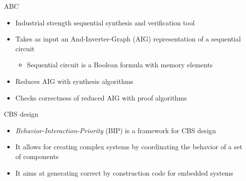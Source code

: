 \begin{frame}{ABC~\cite{brayton2010abc}}
 \begin{itemize}
  \item 
   Industrial strength sequential synthesis and verification tool
  \item 
   Takes as input an And-Inverter-Graph (AIG) representation of a sequential circuit
 \begin{itemize}
  \item Sequential circuit is a Boolean formula with memory elements
 \end{itemize}
  \item Reduces AIG with synthesis algorithms 
  \item Checks correctness of reduced AIG with proof algorithms
 \end{itemize}
\end{frame}

\begin{frame}{CBS design}
  \begin{itemize}
   \item {\em Behavior-Interaction-Priority} (BIP) is a framework for CBS design 
   \item It allows for creating complex systems by coordinating the behavior of 
   a set of components
   \item 
    It aims at generating correct by construction code for embedded systems
  \end{itemize}
\end{frame}

